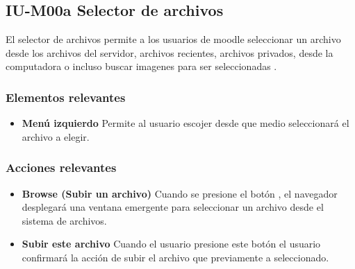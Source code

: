 
\subsection{IU-M00a Selector de archivos}

 El selector de archivos permite a los usuarios de moodle seleccionar un archivo desde los archivos
 del servidor, archivos recientes, archivos privados, desde la computadora o incluso buscar imagenes
 para ser seleccionadas \cite{MoodleSelectorArchivos}.


\subsubsection{Elementos relevantes}

    \begin{itemize}
    \item {\bf Menú izquierdo}
        Permite al usuario escojer desde que medio seleccionará el archivo a elegir.
    \end{itemize}

\subsubsection{Acciones relevantes}

    \begin{itemize}
    \item {\bf Browse (Subir un archivo)}
        Cuando se presione el botón , el navegador desplegará una ventana
        emergente para seleccionar un archivo desde el sistema de archivos.

    \item {\bf Subir este archivo}
        Cuando el usuario presione este botón el usuario confirmará la acción de subir
        el archivo que previamente a seleccionado.
    \end{itemize}
